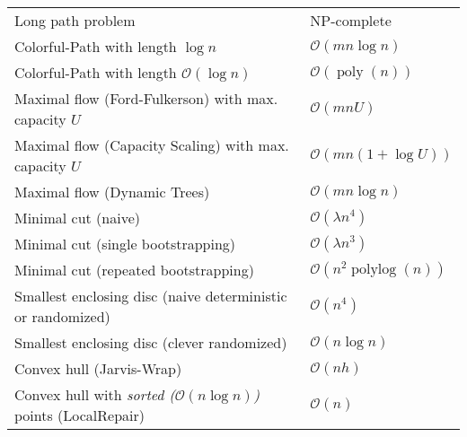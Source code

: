 \documentclass[a4paper,10pt]{article}
\newcommand{\bigO}{\mathcal{O}}
\DeclareMathOperator{\poly}{poly}
\DeclareMathOperator{\polylog}{polylog}
\begin{document}
\begin{center}
\begin{tabularx}{\textwidth}{Xl}
        Long path problem & NP-complete \\
        Colorful-Path with length \(\log n\) & \(\bigO(mn \log n)\) \\
        Colorful-Path with length \(\bigO(\log n)\) & \(\bigO(\poly(n))\) \\
        Maximal flow (Ford-Fulkerson) with max. capacity $U$ & \(\bigO(mnU)\)\\
        Maximal flow (Capacity Scaling) with max. capacity $U$ & \(\bigO(mn(1 + \log U))\) \\
        Maximal flow (Dynamic Trees) & \(\bigO(mn\log n)\) \\
        Minimal cut (naive) & \(\bigO(\lambda n^4)\) \\
        Minimal cut (single bootstrapping) & \(\bigO(\lambda n^3)\) \\
        Minimal cut (repeated bootstrapping) & \(\bigO(n^2\polylog(n))\) \\
        Smallest enclosing disc (naive deterministic or randomized) & \(\bigO(n^4)\)\footnotemark[\value{footnote}] \\
        Smallest enclosing disc (clever randomized) & \(\bigO(n \log n)\)\footnotemark[\value{footnote}] \\
        Convex hull (Jarvis-Wrap) & \(\bigO(nh)\) \\
        Convex hull with \emph{sorted ($\bigO(n \log n)$)} points (LocalRepair) & \(\bigO(n)\) \\
        \bottomrule
    \end{tabularx}
    \end{center}
\end{document}
